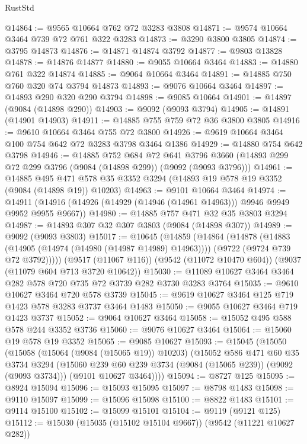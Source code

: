 \begin{lexlean}{RustStd}
\begin{coremodule}
@14864 := @9565 @10664 @762 @72 @3283 @3808
@14871 := @9574 @10664 @3464 @739 @72 @761 @322 @3283
@14873 := @3290 @3800 @3805
@14874 := @3795 @14873
@14876 := @14871 @14874 @3792
@14877 := @9803 @13828
@14878 := @14876 @14877
@14880 := @9055 @10664 @3464
@14883 := @14880 @761 @322 @14874
@14885 := @9064 @10664 @3464
@14891 := @14885 @750 @760 @320 @74 @3794 @14873
@14893 := @9076 @10664 @3464
@14897 := @14893 @290 @320 @290 @3794
@14898 := @9085 @10664
@14901 := @14897 (@9084 (@14898 @290))
@14903 := @9092 (@9093 @3794)
@14905 := @14891 (@14901 @14903)
@14911 := @14885 @755 @759 @72 @36 @3800 @3805
@14916 := @9610 @10664 @3464 @755 @72 @3800
@14926 := @9619 @10664 @3464 @100 @754 @642 @72 @3283 @3798 @3464 @1386
@14929 := @14880 @754 @642 @3798
@14946 := @14885
    @752
    @684
    @72
    @641
    @3796
    @3660
    (@14893 @299 @72 @299 @3796 (@9084 (@14898 @299)) (@9092 (@9093 @3796)))
@14961 := @14885
    @495
    @471
    @578
    @35
    @3352
    @3294
    (@14893 @19 @578 @19 @3352 (@9084 (@14898 @19)) @10203)
@14963 := @9101 @10664 @3464
@14974 := @14911 (@14916 (@14926 (@14929 (@14946 (@14961 @14963))) @9946 @9949 @9952 @9955 @9667))
@14980 := @14885 @757 @471 @32 @35 @3803 @3294
@14987 := @14893 @307 @32 @307 @3803 (@9084 (@14898 @307))
@14989 := @9092 (@9093 @3803)
@15017 := @10645
    (@14859
      (@14864
        (@14878
          (@14883 (@14905 (@14974 (@14980 (@14987 @14989) @14963))))
          (@9722 (@9724 @739 @72 @3792)))))
    (@9517 (@11067 @116))
    (@9542 (@11072 @10470 @604))
    (@9037 (@11079 @604 @713 @3720 @10642))
@15030 := @11089 @10627 @3464 @3464 @282 @578 @720 @735 @72 @3739 @282 @3730 @3283 @3764
@15035 := @9610 @10627 @3464 @720 @578 @3739
@15045 := @9619 @10627 @3464 @125 @719 @1423 @578 @3283 @3737 @3464 @1483
@15050 := @9055 @10627 @3464 @719 @1423 @3737
@15052 := @9064 @10627 @3464
@15058 := @15052 @495 @588 @578 @244 @3352 @3736
@15060 := @9076 @10627 @3464
@15064 := @15060 @19 @578 @19 @3352
@15065 := @9085 @10627
@15093 := @15045
    (@15050
      (@15058
        (@15064 (@9084 (@15065 @19)) @10203)
        (@15052
          @586
          @471
          @60
          @35
          @3734
          @3294
          (@15060 @239 @60 @239 @3734 (@9084 (@15065 @239)) (@9092 (@9093 @3734)))
          (@9101 @10627 @3464))))
@15094 := @8727 @125
@15095 := @8924 @15094
@15096 := @15093 @15095
@15097 := @8798 @1483
@15098 := @9110 @15097
@15099 := @15096 @15098
@15100 := @8822 @1483
@15101 := @9114 @15100
@15102 := @15099 @15101
@15104 := @9119 (@9121 @125)
@15112 := @15030 (@15035 (@15102 @15104 @9667)) (@9542 (@11221 @10627 @282))

\end{coremodule}
\end{lexlean}
